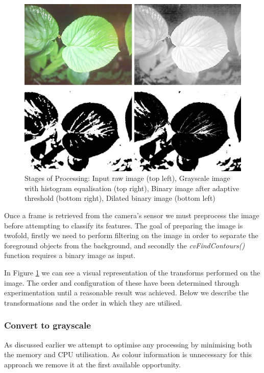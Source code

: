 \begin{figure}[h!]
\centering
    \includegraphics[width=1.0\textwidth]{leaf_identification/images/stages_of_processing.png}
    \caption{Stages of Processing: Input raw image (top left), Grayscale image with histogram equalisation (top right), Binary image after adaptive threshold (bottom right), Dilated binary image (bottom left)}%
    \label{stages_of_processing}
\end{figure}

Once a frame is retrieved from the camera's sensor we must preprocess the image before attempting to classify its features. The goal of preparing the image is twofold, firstly we need to perform filtering on the image in order to separate the foreground objects from the background, and secondly the \emph{cvFindContours()} function requires a binary image as input.

In Figure \ref{stages_of_processing} we can see a visual representation of the transforms performed on the image. The order and configuration of these have been determined through experimentation until a reasonable result was achieved. Below we describe the transformations and the order in which they are utilised.


\subsubsection{Convert to grayscale}
As discussed earlier we attempt to optimise any processing by minimising both the memory and CPU utilisation. As colour information is unnecessary for this approach we remove it at the first available opportunity.

